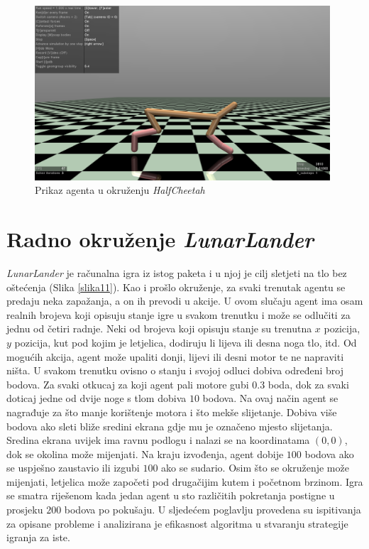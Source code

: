 \documentclass[times, utf8, diplomski, numeric]{fer}
\begin{document}
\begin{figure}
  \centering
  \includegraphics[height=6.5cm]{slika10}
  \caption{Prikaz agenta u okruženju \textit{HalfCheetah}}
  \label{slika10}
\end{figure}

\section{Radno okruženje \textit{LunarLander}}
\textit{LunarLander} je računalna igra iz istog paketa i u njoj je cilj sletjeti na tlo bez oštećenja (Slika \ref{slika11}). Kao i prošlo okruženje, za svaki trenutak agentu se predaju neka zapažanja, a on ih prevodi u akcije. U ovom slučaju agent ima osam realnih brojeva koji opisuju stanje igre u svakom trenutku i može se odlučiti za jednu od četiri radnje. Neki od brojeva koji opisuju stanje su trenutna $x$ pozicija, $y$ pozicija, kut pod kojim je letjelica, dodiruju li lijeva ili desna noga tlo, itd. Od mogućih akcija, agent može upaliti donji, lijevi ili desni motor te ne napraviti ništa. U svakom trenutku ovisno o stanju i svojoj odluci dobiva određeni broj bodova. Za svaki otkucaj za koji agent pali motore gubi $0.3$ boda, dok za svaki doticaj jedne od dvije noge s tlom dobiva $10$ bodova. Na ovaj način agent se nagrađuje za što manje korištenje motora i što mekše slijetanje. Dobiva više bodova ako sleti bliže sredini ekrana gdje mu je označeno mjesto slijetanja. Sredina ekrana uvijek ima ravnu podlogu i nalazi se na koordinatama $(0, 0)$, dok se okolina može mijenjati. Na kraju izvođenja, agent dobije $100$ bodova ako se uspješno zaustavio ili izgubi $100$ ako se sudario. Osim što se okruženje može mijenjati, letjelica može započeti pod drugačijim kutem i početnom brzinom. Igra se smatra riješenom kada jedan agent u sto različitih pokretanja postigne u prosjeku $200$ bodova po pokušaju. U sljedećem poglavlju provedena su ispitivanja za opisane probleme i analizirana je efikasnost algoritma u stvaranju strategije igranja za iste.
\end{document}
